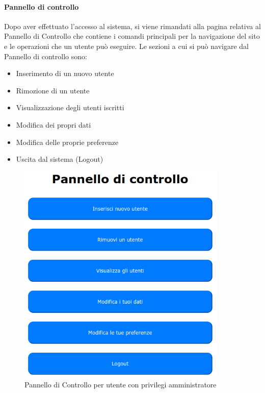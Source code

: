 \paragraph{Pannello di controllo}
Dopo aver effettuato l'accesso al sistema, si viene rimandati alla pagina relativa al Pannello di Controllo che contiene i comandi principali per la navigazione del sito e le operazioni che un utente può eseguire.
Le sezioni a cui si può navigare dal Pannello di controllo sono:
\begin{itemize}
    \item Inserimento di un nuovo utente
    \item Rimozione di un utente
    \item Visualizzazione degli utenti iscritti
    \item Modifica dei propri dati
    \item Modifica delle proprie preferenze
	\item Uscita dal sistema (Logout)
\end{itemize}
\begin{figure}[H]
    \centering
    \includegraphics[width=10cm]{img/admin_panel_1.png}
    \caption{Pannello di Controllo per utente con privilegi amministratore}
\end{figure}


